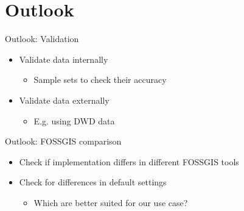 
\section{Outlook}
\begin{frame}{Outlook: Validation}
	\begin{itemize}
		\item Validate data internally
		\begin{itemize}
			\item Sample sets to check their accuracy
		\end{itemize}
		\item Validate data externally
		\begin{itemize}
			\item E.g. using DWD data
		\end{itemize}
	\end{itemize}
\end{frame}
\begin{frame}{Outlook: FOSSGIS comparison}
\begin{itemize}
	\item Check if implementation differs in different FOSSGIS tools
	\item Check for differences in default settings
	\begin{itemize}
		\item Which are better suited for our use case?
	\end{itemize}
\end{itemize}
\end{frame}